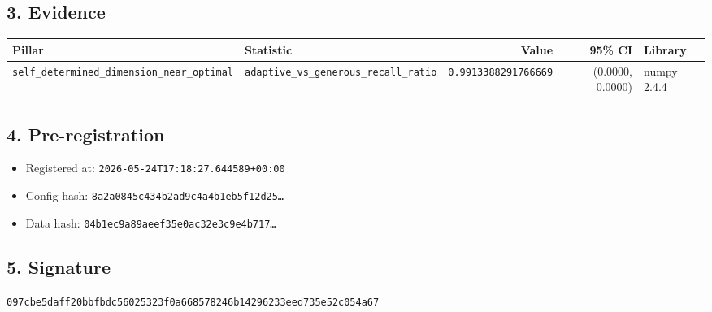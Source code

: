 \documentclass{article}
\begin{document}
\subsection*{3. Evidence}
\begin{tabular}{llrrl}\toprule
\textbf{Pillar} & \textbf{Statistic} & \textbf{Value} & \textbf{95\% CI} & \textbf{Library} \\\midrule
\texttt{self\_determined\_dimension\_near\_optimal} & \texttt{adaptive\_vs\_generous\_recall\_ratio} & \texttt{0.9913388291766669} & (0.0000, 0.0000) & numpy 2.4.4 \\
\bottomrule\end{tabular}
\subsection*{4. Pre-registration}
\begin{itemize}
\item Registered at: \texttt{2026-05-24T17:18:27.644589+00:00}
\item Config hash: \texttt{8a2a0845c434b2ad9c4a4b1eb5f12d25\dots}
\item Data hash: \texttt{04b1ec9a89aeef35e0ac32e3c9e4b717\dots}
\end{itemize}
\subsection*{5. Signature}
\texttt{097cbe5daff20bbfbdc56025323f0a668578246b14296233eed735e52c054a67}\\
\end{document}
